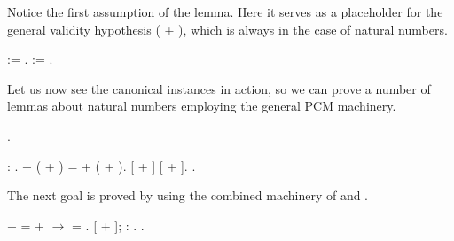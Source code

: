 Notice the first assumption  of the lemma. Here it serves as a
placeholder for the general validity hypothesis  ( + ),
which is always  in the case of natural numbers.


\begin{coqdoccode}
\coqdocemptyline
\coqdocnoindent
{}  :=  .\coqdoceol
\coqdocemptyline
\coqdocnoindent
{}  :=   .\coqdoceol
\coqdocemptyline
\end{coqdoccode}


Let us now see the canonical instances in action, so we can prove a
number of lemmas about natural numbers employing the general PCM
machinery.


\begin{coqdoccode}
\coqdocemptyline
\coqdocnoindent
{} .\coqdoceol
\coqdocemptyline
\end{coqdoccode}
\label{pg:addnprops} \begin{coqdoccode}
\coqdocemptyline
\coqdocnoindent
{}   : .\coqdoceol
\coqdocemptyline
\coqdocnoindent
{}  + ( + ) =   + ( + ).\coqdoceol
\coqdocnoindent
{}   [ + \coqdocvar{\_}] [ + \coqdocvar{\_}].\coqdoceol
\coqdocnoindent
{}.\coqdoceol
\coqdocemptyline
\end{coqdoccode}


The next goal is proved by using the combined machinery of  and
.


\begin{coqdoccode}
\coqdocemptyline
\coqdocnoindent
{}  +  =  +  \ensuremath{\rightarrow}  = .\coqdoceol
\coqdocnoindent
{}  [ + \coqdocvar{\_}]; : .\coqdoceol
\coqdocnoindent
{}.\coqdoceol
\coqdocemptyline
\end{coqdoccode}


